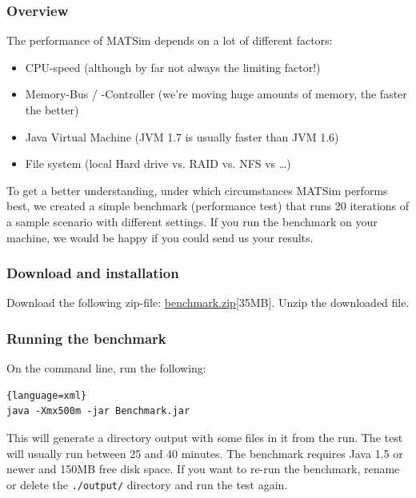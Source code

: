 \subsubsection{Overview}
The performance of MATSim depends on a lot of different factors:
\begin{itemize}
\item CPU-speed (although by far not always the limiting factor!)
\item Memory-Bus / -Controller (we're moving huge amounts of memory, the faster the better)
\item Java Virtual Machine (JVM 1.7 is usually faster than JVM 1.6)%
\item File system (local Hard drive vs. RAID vs. NFS vs \ldots)
\end{itemize}
To get a better understanding, under which circumstances MATSim performs best, we created a simple benchmark (performance test) that runs 20 iterations of a sample scenario with different settings. If you run the benchmark on your machine, we would be happy if you could send us your results.

\subsubsection{Download and installation}
Download the following zip-file: \href{http://matsim.org/files/benchmark/benchmark.zip}{benchmark.zip}{[35MB]}. Unzip the downloaded file.

\subsubsection{Running the benchmark}
On the command line, run the following:
\begin{lstlisting}{language=xml}
java -Xmx500m -jar Benchmark.jar
\end{lstlisting}
This will generate a directory output with some files in it from the run. The test will usually run between 25 and 40 minutes. The benchmark requires Java 1.5 or newer and 150MB free disk space. If you want to re-run the benchmark, rename or delete the \texttt{./output/} directory and run the test again.

